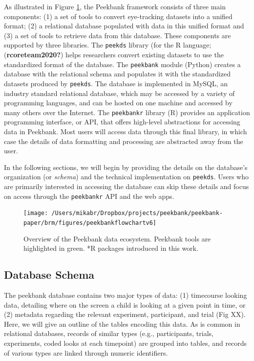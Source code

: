 \documentclass[
  english,
  man,floatsintext]{apa6}
\begin{document}
As illustrated in Figure \ref{fig:fig-framework-overview}, the Peekbank framework consists of three main components: (1) a set of tools to convert eye-tracking datasets into a unified format; (2) a relational database populated with data in this unified format and (3) a set of tools to retrieve data from this database.
These components are supported by three libraries.
The \texttt{peekds} library (for the R language; (\textbf{rcoreteam2020?}) helps researchers convert existing datasets to use the standardized format of the database.
The \texttt{peekbank} module (Python) creates a database with the relational schema and populates it with the standardized datasets produced by \texttt{peekds}.
The database is implemented in MySQL, an industry standard relational database, which may be accessed by a variety of programming languages, and can be hosted on one machine and accessed by many others over the Internet.
The \texttt{peekbankr} library (R) provides an application programming interface, or API, that offers high-level abstractions for accessing data in Peekbank.
Most users will access data through this final library, in which case the details of data formatting and processing are abstracted away from the user.

In the following sections, we will begin by providing the details on the database's organization (or \textit{schema}) and the technical implementation on \texttt{peekds}.
Users who are primarily interested in accessing the database can skip these details and focus on access through the \texttt{peekbankr} API and the web apps.

\begin{figure}

{\centering \texttt{[image: /Users/mikabr/Dropbox/projects/peekbank/peekbank-paper/brm/figures/peekbankflowchartv6]} 

}

\caption{Overview of the Peekbank data ecosystem. Peekbank tools are highlighted in green. *R packages introduced in this work.}\label{fig:fig-framework-overview}
\end{figure}

\hypertarget{database-schema}{%
\subsection{Database Schema}\label{database-schema}}

The peekbank database contains two major types of data: (1) timecourse looking data, detailing where on the screen a child is looking at a given point in time, or (2) metadata regarding the relevant experiment, participant, and trial (Fig XX).
Here, we will give an outline of the tables encoding this data.
As is common in relational databases, records of similar types (e.g., participants, trials, experiments, coded looks at each timepoint) are grouped into tables, and records of various types are linked through numeric identifiers.
\end{document}
